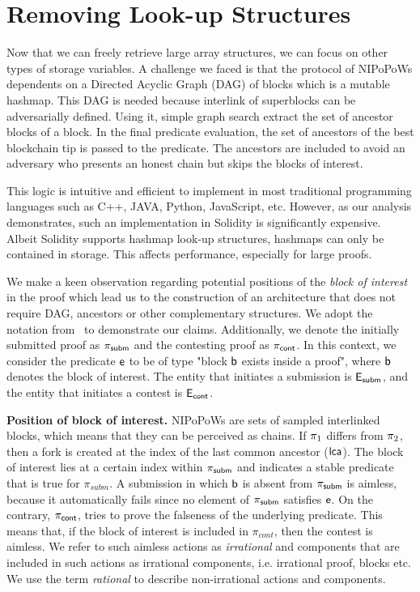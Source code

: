 \section{Removing Look-up Structures}

Now that we can freely retrieve large array structures, we can focus on other
types of storage variables. A challenge we faced is that the protocol of
NIPoPoWs dependents on a Directed Acyclic Graph (DAG) of blocks which is a
mutable hashmap. This DAG is needed because interlink of superblocks can be
adversarially defined. Using it, simple graph search extract the set of
ancestor blocks of a block. In the final predicate evaluation, the set of
ancestors of the best blockchain tip is passed to the predicate. The
ancestors are included to avoid an adversary who presents an honest chain but
skips the blocks of interest.

This logic is intuitive and efficient to implement in most traditional
programming languages such as C++, JAVA, Python, JavaScript, etc. However, as
our analysis demonstrates, such an implementation in Solidity is significantly
expensive. Albeit Solidity supports hashmap look-up structures, hashmaps can
only be contained in storage. This affects performance, especially for large
proofs.

We make a keen observation regarding potential positions of the \emph{block of
interest} in the proof which lead us to the construction of an architecture
that does not require DAG, ancestors or other complementary structures. We
adopt the notation from~\cite{nipopows} to demonstrate our claims.
Additionally, we denote the initially submitted proof as $\mathsf{\pi_{subm}}$ and the
contesting proof as $\mathsf{\pi_{cont}}$. In this context, we consider the predicate $\mathsf{e}$
to be of type "block $\mathsf{b}$ exists inside a proof", where $\mathsf{b}$ denotes
the block of interest. The entity that initiates a submission is $\mathsf{E_{subm}}$, and the
entity that initiates a contest is $\mathsf{E_{cont}}$.

\noindent \textbf{Position of block of interest.} NIPoPoWs are sets of sampled
interlinked blocks, which means that they can be perceived as chains. If
$\mathsf{\pi}_1$ differs from $\mathsf{\pi}_2$, then a fork is created at the index of the last
common ancestor ($\mathsf{lca}$). The block of interest lies at a certain index within
$\mathsf{\pi_{subm}}$ and indicates a stable predicate~\cite{nipopows, generic-client} that is
true for $\pi_{subm}$. A submission in which $\mathsf{b}$ is absent from $\mathsf{\pi_{subm}}$ is
aimless, because it automatically fails since no element of $\mathsf{\pi_{subm}}$ satisfies
$\mathsf{e}$. On the contrary, $\mathsf{\pi_{cont}}$, tries to prove the falseness of the
underlying predicate. This means that, if the block of interest is included in
$\pi_{cont}$, then the contest is aimless. We refer to such aimless actions as
\emph{irrational} and components that are included in such actions as
irrational components, i.e.  irrational proof, blocks etc. We use the term
\emph{rational} to describe non-irrational actions and components.

